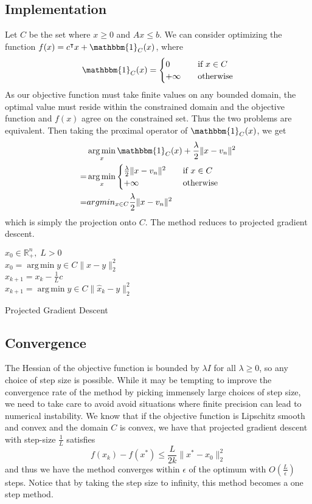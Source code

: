 \documentclass[letterpaper,twocolumn,12pt]{article}
\DeclareMathOperator*{\argmin}{arg\,min}
\begin{document}
\subsection{Implementation}
Let $C$ be the set where $x\geq 0$ and $Ax\leq b$.
We can consider optimizing the function $f(x)=c^\intercal x+\mathbbm{1}_C(x)$, where
$$\mathbbm{1}_C(x) = 
\begin{cases}
  0 &\quad\text{if } x\in C\\
  +\infty &\quad\text{otherwise}\\
\end{cases}
$$
As our objective function must take finite values on any bounded domain, the optimal
value must reside within the constrained domain and the objective function and $f(x)$
agree on the constrained set. Thus the two problems are equivalent. Then taking the
proximal operator of $\mathbbm{1}_C(x)$, we get
\begin{align*}
&\argmin_{x}\mathbbm{1}_C(x)+\frac{\lambda}{2}\|x-v_n\|^2\\
=&\argmin_{x}
\begin{cases}
  \frac{\lambda}{2}\|x-v_n\|^2 &\quad\text{if } x\in C\\
  +\infty &\quad\text{otherwise}\\
\end{cases}\\
=&argmin_{x\in C} \frac{\lambda}{2}\|x-v_n\|^2
\end{align*}
which is simply the projection onto $C$. The method reduces to projected gradient
descent.

\begin{algorithm}
\SetAlgoLined
{}
  $\hat{x}_0\in\mathbb{R}_+^n,\; L>0$\\
  $x_0 = \argmin{y\in C} \|x-y\|_2^2$\\
  {
  $\hat{x}_{k+1} = x_k-\frac{1}{L}c$\\
  $x_{k+1} = \argmin{y\in C} \|\hat{x}_k-y\|_2^2$
  }
  \caption{Projected Gradient Descent}
\end{algorithm}

\subsection{Convergence}
The Hessian of the objective function is bounded by $\lambda I$ for all $\lambda\geq 0$,
so any choice of step size is possible. While it may be tempting to improve the convergence
rate of the method by picking immensely large choices of step size, we need to take care
to avoid avoid situations where finite precision can lead to numerical instability.
We know that if the objective function is Lipschitz smooth and convex and the domain
$C$ is convex, we have that projected gradient descent with step-size $\frac{1}{L}$
satisfies
$$f(x_k)-f(x^*)\leq \frac{L}{2k}\|x^*-x_0\|_2^2$$
and thus we have the method converges within $\epsilon$ of the optimum with
$O(\frac{L}{\epsilon})$ steps\cite{Saunders}. Notice that by taking the step size to
infinity, this method becomes a one step method.
\end{document}
